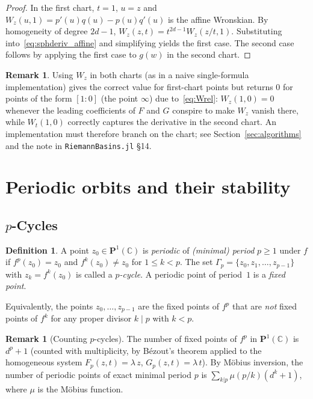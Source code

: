 \documentclass[12pt]{article}
\theoremstyle{definition}
\newtheorem{definition}[theorem]{Definition}
\newtheorem{remark}[theorem]{Remark}
\newcommand{\C}{\mathbb{C}}
\newcommand{\Pone}{\mathbf{P}^1(\C)}
\begin{document}
\begin{proof}
In the first chart, $t=1$, $u=z$ and
$W_z(u,1) = p'(u)q(u)-p(u)q'(u)$ is the affine Wronskian.
By homogeneity of degree $2d-1$, $W_z(z,t)=t^{2d-1}W_z(z/t,1)$.
Substituting into~\eqref{eq:sphderiv_affine} and simplifying yields the
first case.  The second case follows by applying the first case to $g(w)$
in the second chart.
\end{proof}

\begin{remark}\label{rem:chartbug}
Using $W_z$ in both charts (as in a naive single-formula implementation)
gives the correct value for first-chart points but returns $0$ for
points of the form $[1:0]$ (the point $\infty$) due to~\eqref{eq:Wrel}:
$W_z(1,0) = 0$ whenever the leading coefficients of $F$ and $G$
conspire to make $W_z$ vanish there, while $W_t(1,0)$ correctly
captures the derivative in the second chart.  An implementation must
therefore branch on the chart; see Section~\ref{sec:algorithms} and
the note in \texttt{RiemannBasins.jl} \S14.
\end{remark}

\section{Periodic orbits and their stability}
\label{sec:periodic}

\subsection{$p$-Cycles}

\begin{definition}\label{def:pcycle}
A point $z_0\in\Pone$ is \emph{periodic} of \emph{(minimal) period} $p\geq 1$
under $f$ if $f^p(z_0)=z_0$ and $f^k(z_0)\neq z_0$ for $1\leq k<p$.
The set $\Gamma_p = \{z_0, z_1,\ldots,z_{p-1}\}$ with $z_k=f^k(z_0)$ is
called a \emph{$p$-cycle}.  A periodic point of period~$1$ is a \emph{fixed
point}.
\end{definition}

Equivalently, the points $z_0,\ldots,z_{p-1}$ are the fixed points of $f^p$
that are \emph{not} fixed points of $f^k$ for any proper divisor $k\mid p$
with $k<p$.

\begin{remark}[Counting $p$-cycles]
The number of fixed points of $f^p$ in $\Pone$ is $d^p+1$ (counted with
multiplicity, by B\'ezout's theorem applied to the homogeneous system
$F_p(z,t)=\lambda\,z$, $G_p(z,t)=\lambda\,t$).  By M\"obius inversion, the
number of periodic points of exact minimal period $p$ is
$\sum_{k|p}\mu(p/k)(d^k+1)$, where $\mu$ is the M\"obius function.
\end{remark}
\end{document}
